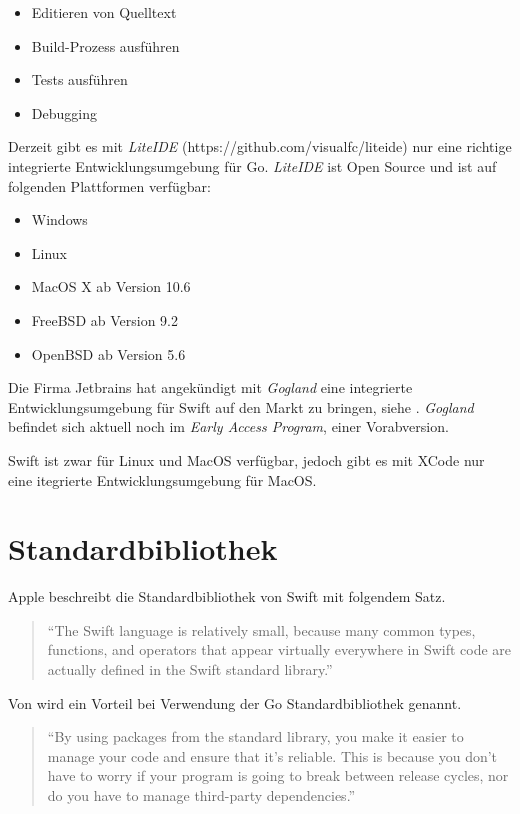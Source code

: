 \begin{itemize}
    \item Editieren von Quelltext
    \item Build-Prozess ausführen
    \item Tests ausführen
    \item Debugging
\end{itemize}

Derzeit gibt es mit \textit{LiteIDE} (https://github.com/visualfc/liteide) nur eine richtige integrierte Entwicklungsumgebung für Go.
\textit{LiteIDE} ist Open Source und ist auf folgenden Plattformen verfügbar:

\begin{itemize}
    \item Windows 
    \item Linux
    \item MacOS X ab Version 10.6
    \item FreeBSD ab Version 9.2
    \item OpenBSD ab Version 5.6
\end{itemize}

Die Firma Jetbrains hat angekündigt mit \textit{Gogland}\cite[]{Gogland} eine integrierte Entwicklungsumgebung für Swift auf den Markt zu bringen, siehe \cite[]{Gogland.Heise}.
\textit{Gogland} befindet sich aktuell noch im \textit{Early Access Program}, einer Vorabversion.

Swift ist zwar für Linux und MacOS verfügbar, jedoch gibt es mit XCode nur eine itegrierte Entwicklungsumgebung für MacOS.

\section{Standardbibliothek}
Apple beschreibt die Standardbibliothek von Swift mit folgendem Satz.
\begin{quote}
\enquote{The Swift language is relatively small, because many common types, functions, and operators that appear virtually everywhere in Swift code are actually defined in the Swift standard library.} \cite[S.427]{Apple.2017}
\end{quote}

Von \cite[S.184]{Kennedy.2016} wird ein Vorteil bei Verwendung der Go Standardbibliothek genannt. 

\begin{quote}
\enquote{By using packages from the standard library, you make it easier to manage your code and ensure that it’s reliable. This is because you
don’t have to worry if your program is going to break between release cycles, nor do
you have to manage third-party dependencies.} \cite[S.185]{Kennedy.2016}
\end{quote}

